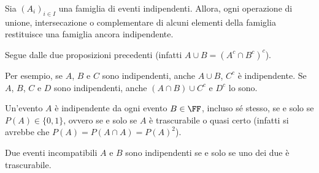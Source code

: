 \begin{multicols*}{2}
    \begin{theorem}
        Sia $(A_i)_{i \in I}$ una famiglia di eventi indipendenti. Allora,
        ogni operazione di unione, intersecazione o complementare di alcuni elementi della famiglia restituisce una famiglia ancora indipendente. \smallskip

        Segue dalle due proposizioni precedenti (infatti $A \cup B = (A^c \cap B^c)^c$).
    \end{theorem}

    \begin{example}
        Per esempio, se $A$, $B$ e $C$ sono indipendenti, anche $A \cup B$, $C^c$
        è indipendente. Se $A$, $B$, $C$ e $D$ sono indipendenti, anche
        $(A \cap B) \cup C^c$ e $D^c$ lo sono.
    \end{example}

    \begin{remark}
        Un'evento $A$ è indipendente da ogni evento $B \in \FF$, incluso
        sé stesso, se e solo se $P(A) \in \{0, 1\}$, ovvero se e solo
        se $A$ è trascurabile o quasi certo (infatti si avrebbe che
        $P(A) = P(A \cap A) = P(A)^2$).
    \end{remark}

    \begin{remark}
        Due eventi incompatibili $A$ e $B$ sono indipendenti se e solo se
        uno dei due è trascurabile.
    \end{remark}
\end{multicols*}
